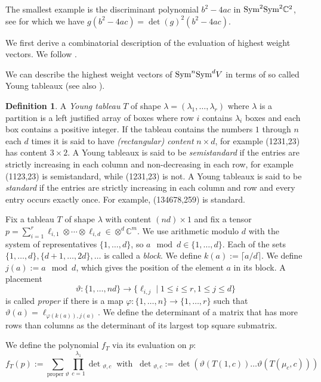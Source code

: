 \documentclass[10pt,a4paper]{article}
\numberwithin{equation}{section}
\theoremstyle{definition}
\newtheorem{definition}[equation]{Definition}
\newcommand{\Sym}{\textup{Sym}}
\newcommand{\IC}{\mathbb{C}}
\newcommand{\la}{\lambda}
\begin{document}
The smallest example is the discriminant polynomial $b^2-4ac$ in $\Sym^2 \Sym^2 \IC^2$, see \cite[Exa.~9.1.4]{BI:17} for which we have $g(b^2-4ac) = \det(g)^2 (b^2-4ac)$.


%
%
%
%
We first derive a combinatorial description of the evaluation of highest weight vectors. We follow \cite{cheung2017symmetrizing, BI:17b}.

We can describe the highest weight vectors of $\Sym^n\Sym^d V$ in terms of so called Young tableaux (see also \cite[\S3.9]{Ott:13}).
\begin{definition}
    A \emph{Young tableau} $T$ of shape $\lambda = (\lambda_1, \ldots, \lambda_r)$ where $\lambda$ is a partition is a left justified array of boxes where row $i$ contains $\lambda_i$ boxes and each box contains a positive integer.
    If the tableau contains the numbers $1$ through $n$ each $d$ times it is said to have \emph{(rectangular) content} $n \times d$, for example {\tiny\young(1231,23)} has content $3\times 2$.
    A Young tableaux is said to be \emph{semistandard} if the entries are strictly increasing in each column and non-decreasing in each row, for example {\tiny\young(1123,23)} is semistandard, while {\tiny\young(1231,23)} is not.
    A Young tableaux is said to be \emph{standard} if the entries are strictly increasing in each column and row and every entry occurs exactly once. For example, {\tiny\young(134678,259)} is standard.
\end{definition}

Fix a tableau $T$ of shape $\la$ with content $(nd)\times 1$ and fix a tensor $p = \sum_{i=1}^r \ell_{i,1}\otimes\cdots\otimes\ell_{i,d} \in \otimes^d \IC^m$.
We use arithmetic modulo $d$ with the system of representatives $\{1,\ldots,d\}$, so $a \mod d \in \{1,\ldots,d\}$.
Each of the sets $\{1,\ldots,d\}, \{d+1,\ldots,2d\},\ldots$ is called a \emph{block}.
We define $k(a) := \lceil a / d\rceil$. We define $j(a) := a \mod d$, which gives the position of the element $a$ in its block.
A placement
\[
\vartheta : \{1, \ldots, nd\} \to \{\ell_{i,j} \mid 1 \leq i \leq r, 1 \leq j \leq d\}
\]
is called \emph{proper} if
there is a map $\varphi:\{1,\ldots,n\}\to\{1,\ldots,r\}$
such that
$\vartheta(a) = \ell_{\varphi(k(a)),j(a)}$.
We define the determinant of a matrix that has more rows than columns as the determinant of its largest top square submatrix.

We define the polynomial $f_T$ via its evaluation on $p$:
\begin{equation}\label{eq:sumpropertheta}
    f_T(p)
    := \sum_{\text{proper\ }\vartheta} \prod_{c = 1}^{\lambda_1}\det{}_{\vartheta, c} \ \text{ with } \ \det{}_{\vartheta, c} := \det\left(\vartheta(T(1, c)) \dots \vartheta(T(\mu_c, c))\right)
\end{equation}
\end{document}
